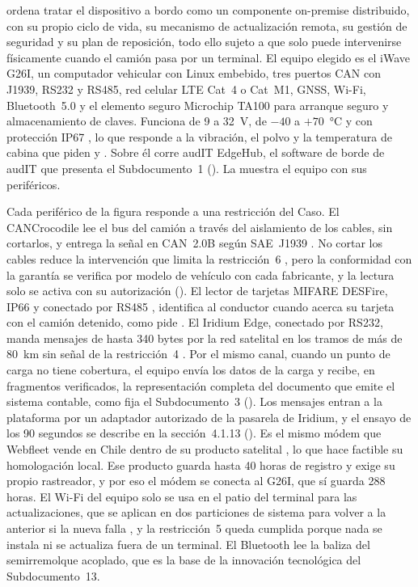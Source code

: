  ordena tratar el dispositivo a bordo como un componente on-premise distribuido,
con su propio ciclo de vida, su mecanismo de actualización remota, su gestión de seguridad y su plan
de reposición, todo ello sujeto a que solo puede intervenirse físicamente cuando el camión pasa por un
terminal. El equipo elegido es el iWave G26I, un computador vehicular con Linux embebido, tres puertos
CAN con J1939, RS232 y RS485, red celular LTE Cat~4 o Cat~M1, GNSS, Wi-Fi, Bluetooth~5.0 y el elemento
seguro Microchip TA100 para arranque seguro y almacenamiento de claves. Funciona de 9 a 32~V, de
$-40$ a $+70$~°C y con protección IP67 \parencite{iwave_g26i}, lo que responde a la vibración, el polvo
y la temperatura de cabina que piden  y . Sobre él corre audIT EdgeHub, el software de
borde de audIT que presenta el Subdocumento~1 (). La  muestra el equipo con sus periféricos.


Cada periférico de la figura responde a una restricción del Caso. El CANCrocodile lee el bus del camión
a través del aislamiento de los cables, sin cortarlos, y entrega la señal en CAN~2.0B según SAE~J1939
\parencite{technoton_cancrocodile}. No cortar los cables reduce la intervención que limita la
restricción~6 , pero la conformidad con la garantía se verifica por modelo de
vehículo con cada fabricante, y la lectura solo se activa con su autorización (). El lector de tarjetas MIFARE DESFire, IP66 y conectado por RS485
\parencite{gao_desfire}, identifica al conductor cuando acerca su tarjeta con el camión detenido, como
pide . El Iridium Edge, conectado por RS232, manda mensajes de hasta 340 bytes por
la red satelital \parencite{groundcontrol_edge} en los tramos de más de 80~km sin señal de la
restricción~4 . Por el mismo canal, cuando un punto de carga no tiene
cobertura, el equipo envía los datos de la carga y recibe, en fragmentos verificados, la representación
completa del documento que emite el sistema contable, como fija el Subdocumento~3
(). Los mensajes entran a la plataforma por un adaptador autorizado de la
pasarela de Iridium, y el ensayo de los 90 segundos se describe en la sección~4.1.13
(). Es el mismo módem que Webfleet vende en Chile dentro de su
producto satelital \parencite{webfleet_sat_cl}, lo que hace factible su homologación local. Ese
producto guarda hasta 40 horas de registro y exige su propio rastreador, y por eso el módem se conecta
al G26I, que sí guarda 288 horas. El Wi-Fi del equipo solo se usa en el patio del terminal para las
actualizaciones, que se aplican en dos particiones de sistema para volver a la anterior si la nueva
falla \parencite{mender_variables}, y la restricción~5 queda cumplida porque nada se instala ni se
actualiza fuera de un terminal. El Bluetooth lee la baliza del semirremolque acoplado, que es la base
de la innovación tecnológica del Subdocumento~13.


